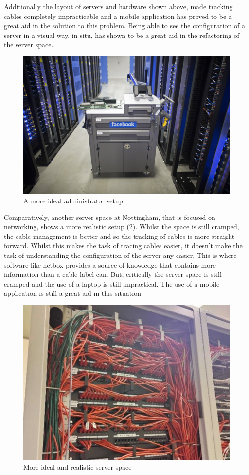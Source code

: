 \documentclass [11pt,a4paper]{article}
\begin{document}
Additionally the layout of servers and hardware shown above, made tracking cables completely impracticable and a mobile application has proved to be a great aid in the solution to this problem. Being able to see the configuration of a server in a visual way, in situ, has shown to be a great aid in the refactoring of the server space.

\begin{figure}[H]
    \centering
    \includegraphics[width=0.42\linewidth]{images/facebook_cart.jpg}
    \caption{A more ideal administrator setup \cite{rosenblatt_2018}}
    \label{fig:_ideal_server_setup}
\end{figure}

Comparatively, another server space at Nottingham, that is focused on networking, shows a more realistic setup (\ref{fig:ideal_server_space}). Whilst the space is still cramped, the cable management is better and so the tracking of cables is more straight forward. Whilst this makes the task of tracing cables easier, it doesn't make the task of understanding the configuration of the server any easier. This is where software like netbox provides a source of knowledge that contains more information than a cable label can. But, critically the server space is still cramped and the use of a laptop is still impractical. The use of a mobile application is still a great aid in this situation.

\begin{figure}[H]
    \centering
    \includegraphics[width=0.43\linewidth]{images/server_racks_clean.jpg}
    \caption{More ideal and realistic server space}
    \label{fig:ideal_server_space}
\end{figure}
\end{document}
